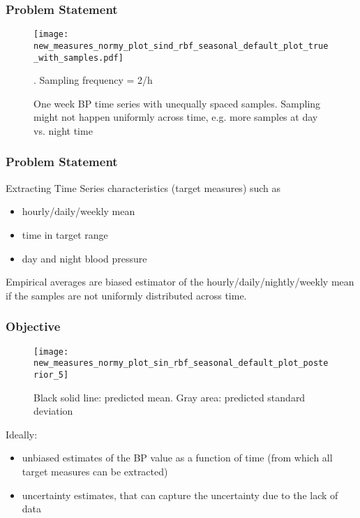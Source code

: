 \documentclass[
	8pt, %
]{beamer}
\begin{document}


\begin{frame}
	\frametitle{Problem Statement}

		\begin{figure}
				\texttt{[image: new\_measures\_normy\_plot\_sind\_rbf\_seasonal\_default\_plot\_true\_with\_samples.pdf]}
				\caption{One week BP time series with unequally spaced samples. Sampling might not happen
				uniformly across time, e.g. more samples at day vs. night time}. Sampling frequency = 2/h
		\end{figure}

\end{frame}


\begin{frame}
	\frametitle{Problem Statement}

		Extracting Time Series characteristics (target measures) such as
		\begin{itemize}
		\item hourly/daily/weekly mean
		\item time in target range
		\item day and night blood pressure
		\end{itemize}

	\bigskip %

	Empirical averages are biased estimator of the hourly/daily/nightly/weekly mean if
	the samples are not uniformly distributed across time.

\end{frame}


\begin{frame}
	\frametitle{Objective}

		\begin{figure}
				\texttt{[image: new\_measures\_normy\_plot\_sin\_rbf\_seasonal\_default\_plot\_posterior\_5]}
				\caption{Black solid line: predicted mean. Gray area: predicted standard deviation}
		\end{figure}

	Ideally:
	\begin{itemize}
		\item unbiased estimates of the BP value as a function of time (from which all target
		measures can be extracted)
		\item uncertainty estimates, that can capture the uncertainty due to the lack of data
	\end{itemize}
\end{frame}
\end{document}
